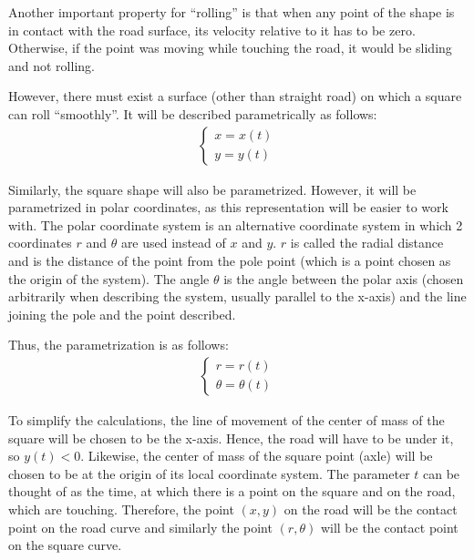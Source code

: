 \documentclass[12pt]{article}
\begin{document}
        Another important property for ``rolling'' is that when any point of the shape is in contact with the road surface, its velocity relative to it has to be zero. Otherwise, if the point was moving while touching the road, it would be sliding and not rolling\cite{morphocular.2022}.

        However, there must exist a surface (other than straight road) on which a square can roll ``smoothly''. It will be described parametrically as follows:
        \begin{align}
            \begin{cases}
            x = x(t) \\
            y = y(t)
            \end{cases}
        \end{align}

        Similarly, the square shape will also be parametrized. However, it will be parametrized in polar coordinates, as this representation will be easier to work with. The polar coordinate system is an alternative coordinate system in which 2 coordinates $r$ and $\theta$ are used instead of $x$ and $y$. $r$ is called the radial distance and is the distance of the point from the pole point (which is a point chosen as the origin of the system). The angle $\theta$ is the angle between the polar axis (chosen arbitrarily when describing the system, usually parallel to the x-axis) and the line joining the pole and the point described.\cite{Sundstrom2021Polar}
        
        Thus, the parametrization is as follows: 
        \begin{align}
            \begin{cases}
            r = r(t) \\
            \theta = \theta(t)
            \end{cases}
        \end{align}

        To simplify the calculations, the line of movement of the center of mass of the square will be chosen to be the x-axis. Hence, the road will have to be under it, so $y(t) < 0$. Likewise, the center of mass of the square point (axle) will be chosen to be at the origin of its local coordinate system. The parameter $t$ can be thought of as the time, at which there is a point on the square and on the road, which are touching. Therefore, the point $(x, y)$ on the road will be the contact point on the road curve and similarly the point $(r, \theta)$ will be the contact point on the square curve.
\end{document}
